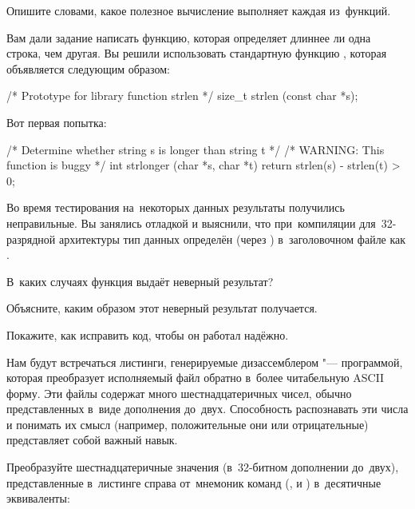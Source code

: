 \begin{exercise}
\begin{enumIssue}
  \item Опишите словами, какое полезное вычисление выполняет каждая из~функций.
\end{enumIssue}


\item Вам дали задание написать функцию, которая определяет длиннее ли одна строка, чем другая. Вы решили использовать стандартную функцию , которая объявляется следующим образом:
\begin{ccode}
/* Prototype for library function strlen */
size_t strlen (const char *s);
\end{ccode}

Вот первая попытка:
\begin{ccode}
/* Determine whether string s is longer than string t */
/* WARNING: This function is buggy */
int strlonger (char *s, char *t)
{
  return strlen(s) - strlen(t) > 0;
}
\end{ccode}

Во время тестирования на~некоторых данных результаты получились неправильные. Вы занялись отладкой и выяснили, что при~компиляции для~32-разрядной архитектуры тип данных  определён (через ) в~заголовочном файле  как .
\begin{enumIssue}
  \item В~каких случаях функция выдаёт неверный результат?
  \item Объясните, каким образом этот неверный результат получается.
  \item Покажите, как исправить код, чтобы он работал надёжно.
\end{enumIssue}


\newcommand*{\lstitem}[1]{%
  \makebox[1.5em][r]{\textrm{#1.}}%
}
\item Нам будут встречаться листинги, генерируемые дизассемблером "--- программой, которая преобразует исполняемый файл обратно в~более читабельную ASCII форму. Эти файлы содержат много шестнадцатеричных чисел, обычно представленных в~виде дополнения до~двух. Способность распознавать эти числа и понимать их смысл (например, положительные они или отрицательные) представляет собой важный навык.

Преобразуйте шестнадцатеричные значения (в~32-битном дополнении до~двух), представленные в~листинге справа от~мнемоник команд (,  и ) в~десятичные эквиваленты:

{\newcommand*{\ans}{\hfill\ansvw}%
}



\end{exercise}

